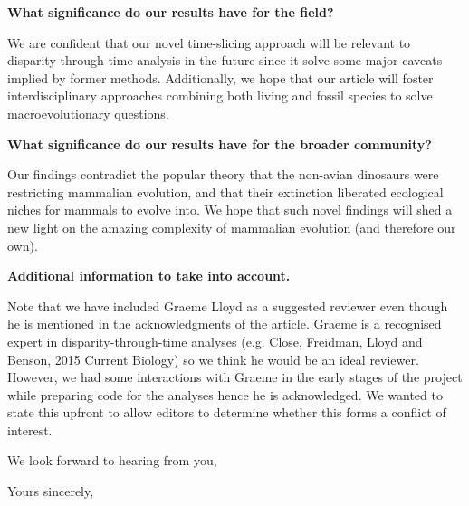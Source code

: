 \documentclass[11pt]{letter}
\begin{document}
\begin{letter}{}
\textbf{What significance do our results have for the field?}

We are confident that our novel time-slicing approach will be relevant to disparity-through-time analysis in the future since it solve some major caveats implied by former methods.
Additionally, we hope that our article will foster interdisciplinary approaches combining both living and fossil species to solve macroevolutionary questions.

\textbf{What significance do our results have for the broader community?}

Our findings contradict the popular theory that the non-avian dinosaurs were restricting mammalian evolution, and that their extinction liberated ecological niches for mammals to evolve into.
We hope that such novel findings will shed a new light on the amazing complexity of mammalian evolution (and therefore our own).

\textbf{Additional information to take into account.}

Note that we have included Graeme Lloyd as a suggested reviewer even though he is mentioned in the acknowledgments of the article.
Graeme is a recognised expert in disparity-through-time analyses (e.g. Close, Freidman, Lloyd and Benson, 2015 Current Biology) so we think he would be an ideal reviewer.
However, we had some interactions with Graeme in the early stages of the project while preparing code for the analyses hence he is acknowledged.
We wanted to state this upfront to allow editors to determine whether this forms a conflict of interest.

We look forward to hearing from you,

\closing{Yours sincerely,}





\end{letter}
\end{document}
